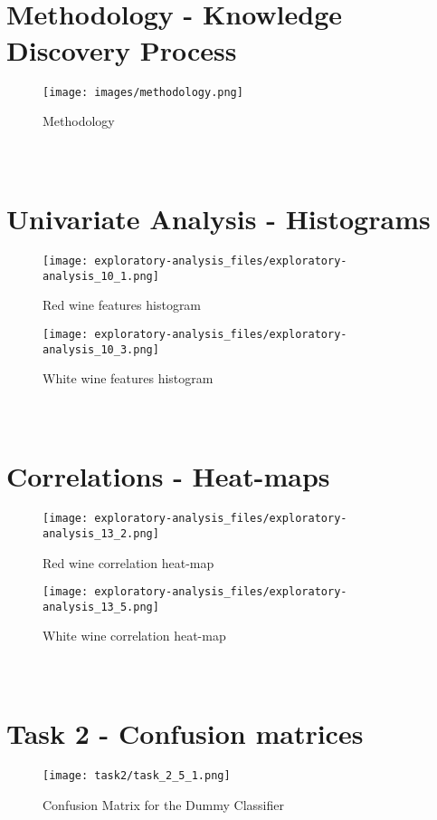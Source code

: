 \documentclass{article}
\begin{document}
\clearpage
\appendix
\section{\\Methodology - Knowledge Discovery Process}
\label{appendix:methodology}

\begin{figure}[H]
\centering
\texttt{[image: images/methodology.png]}
\caption{Methodology}
\label{fig:methodology}
\end{figure}


\section{\\Univariate Analysis - Histograms}
\label{appendix:histograms}
    \begin{figure}[H]
        \centering
        \texttt{[image: exploratory-analysis\_files/exploratory-analysis\_10\_1.png]}
        \caption{Red wine features histogram}
        \label{fig:red-histogram}
    \end{figure}
    \begin{figure}[H]
        \centering
        \texttt{[image: exploratory-analysis\_files/exploratory-analysis\_10\_3.png]}
        \caption{White wine features histogram}
        \label{fig:white-histogram}
    \end{figure}


\section{\\Correlations - Heat-maps}
\label{appendix:heatmaps}
    \begin{figure}[H]
        \centering
        \texttt{[image: exploratory-analysis\_files/exploratory-analysis\_13\_2.png]}
        \caption{Red wine correlation heat-map}
        \label{fig:red-heatmap}
    \end{figure}
    \begin{figure}[H]
        \centering
        \texttt{[image: exploratory-analysis\_files/exploratory-analysis\_13\_5.png]}
        \caption{White wine correlation heat-map}
        \label{fig:white-heatmap}
    \end{figure}

\section{\\Task 2 - Confusion matrices}
\label{appendix:task2-confusion-matrices}
    \begin{figure}[H]
    \centering
    \texttt{[image: task2/task\_2\_5\_1.png]}
    \caption{Confusion Matrix for the Dummy Classifier}
    \label{fig:dummy_confusion_matrix}
    \end{figure}
\end{document}
